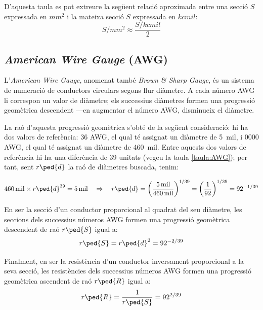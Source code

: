 D'aquesta taula es pot extreure la següent relació aproximada entre una secció $S$ expressada en $\unit{mm^2}$ i la mateixa secció $S$ expressada en $\unit{kcmil}$:
\begin{equation}
  S/{\scriptstyle\unit{mm^2}} \approx \frac{ S/{\scriptstyle\unit{kcmil}}}{2}
\end{equation}



\subsection{\textit{American Wire Gauge} (AWG)}\label{sec:awg}

L'\textit{American Wire Gauge}, anomenat també \textit{Brown \& Sharp Gauge}, és un sistema de numeració de conductors circulars segons llur diàmetre. A cada número AWG li correspon un valor de diàmetre; els successius diàmetres formen una progressió geomètrica descendent ---en augmentar el número AWG, disminueix el diàmetre.

La raó d'aquesta progressió geomètrica s'obté de la següent consideració: hi ha dos valors de referència: 36 AWG, el qual té assignat un diàmetre de \qty{5}{mil}, i 0000 AWG, el qual té assignat un diàmetre de \qty{460}{mil}. Entre aquests dos valors de referència hi ha una diferència de 39 unitats (vegeu la taula \vref{taula:AWG}); per tant, sent $r\ped{d}$ la raó de diàmetres buscada, tenim:

\begin{equation}
   \qty{460}{mil} \times r\ped{d}^{39} = \qty{5}{mil} \quad \Rightarrow \quad r\ped{d} = \left( \frac{\qty{5}{mil}}{\qty{460}{mil}} \right)^{1/39} = \left( \frac{1}{92} \right)^{1/39} = 92^{-1/39}
\end{equation}

En ser la secció d'un conductor proporcional al quadrat del seu diàmetre, les seccions dels successius números AWG formen una progressió geomètrica  descendent de raó $r\ped{S}$ igual a: \begin{equation}
   r\ped{S} = r\ped{d}^2 = 92^{-2/39}
\end{equation}

Finalment, en ser la resistència d'un conductor inversament proporcional a la seva secció, les resistències dels successius números AWG formen una progressió geomètrica ascendent de raó $r\ped{R}$ igual a:
\begin{equation}
   r\ped{R} = \frac{1}{r\ped{S}} = 92^{2/39}
\end{equation}

